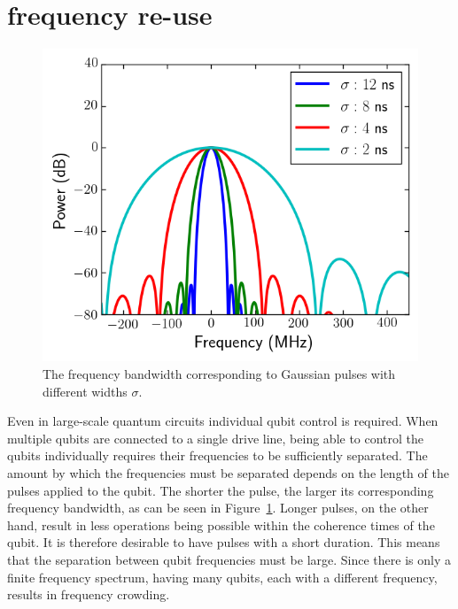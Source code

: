     \section{frequency re-use}
      \begin{figure}
        \begin{center}
        \vspace{-30pt}
          \includegraphics[width=\textwidth]{../Figures/Exploring frequency re-use/bandwidth_broadening.png}
        \end{center}
        \caption{The frequency bandwidth corresponding to Gaussian pulses with different widths $\sigma$.}
        \label{fig:bandwidth broadening}
        \vspace{-20pt}
      \end{figure}

      Even in large-scale quantum circuits individual qubit control is required. When multiple qubits are connected to a single drive line, being able to control the qubits individually requires their frequencies to be sufficiently separated. The amount by which the frequencies must be separated depends on the length of the pulses applied to the qubit. The shorter the pulse, the larger its corresponding frequency bandwidth, as can be seen in Figure~\ref{fig:bandwidth broadening}. Longer pulses, on the other hand, result in less operations being possible within the coherence times of the qubit. It is therefore desirable to have pulses with a short duration. This means that the separation between qubit frequencies must be large. Since there is only a finite frequency spectrum, having many qubits, each with a different frequency, results in frequency crowding.

